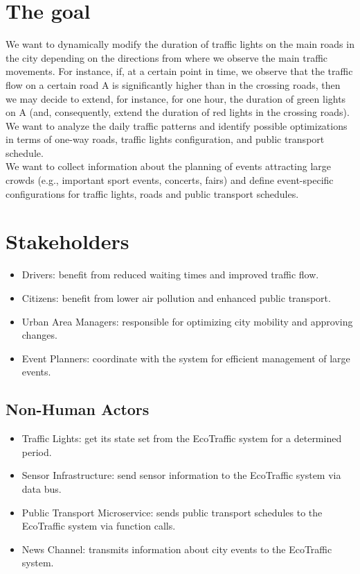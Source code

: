\documentclass[12pt, a4paper, twoside, openright]{report}
\begin{document}
\section{The goal}

We want to dynamically modify the duration of traffic lights on the main
roads in the city depending on the directions from where we observe the
main traffic movements. For instance, if, at a certain point in time, we
observe that the traffic flow on a certain road A is significantly
higher than in the crossing roads, then we may decide to extend, for
instance, for one hour, the duration of green lights on A (and,
consequently, extend the duration of red lights in the crossing
roads).\\
We want to analyze the daily traffic patterns and identify possible
optimizations in terms of one-way roads, traffic lights configuration,
and public transport schedule.\\
We want to collect information about the planning of events attracting
large crowds (e.g., important sport events, concerts, fairs) and define
event-specific configurations for traffic lights, roads and public
transport schedules.

\section{Stakeholders}
\begin{itemize}
  \item Drivers: benefit from reduced waiting times and improved traffic flow.
  \item Citizens: benefit from lower air pollution and enhanced public transport.
  \item Urban Area Managers: responsible for optimizing city mobility and approving changes.
  \item Event Planners: coordinate with the system for efficient management of large events.
\end{itemize}

\subsection{Non-Human Actors}
\begin{itemize}
  \item Traffic Lights: get its state set from the EcoTraffic system for a determined period.
  \item Sensor Infrastructure: send sensor information to the EcoTraffic system via data bus.
  \item Public Transport Microservice: sends public transport schedules to the EcoTraffic system via function calls.
  \item News Channel: transmits information about city events to the EcoTraffic system.
\end{itemize}
\end{document}
